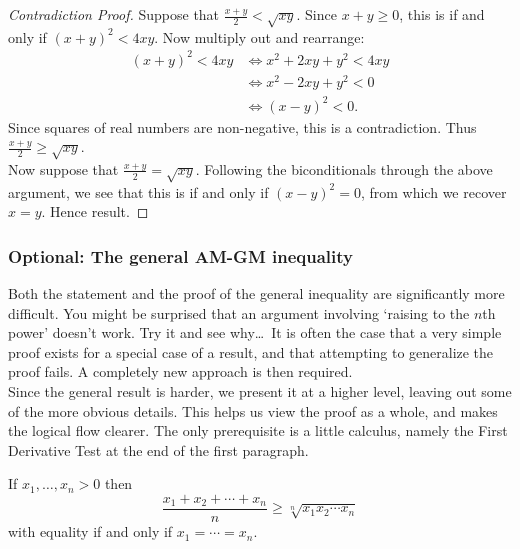 \begin{nopgbreak}
\begin{proof}[Contradiction Proof]
Suppose that $\frac{x+y}{2}<\sqrt{xy}$. Since $x+y\ge 0$, this is if and only if $(x+y)^2<4xy$. Now multiply out and rearrange:
\begin{align*}
(x+y)^2<4xy&\iff x^2+2xy+y^2<4xy\\
&\iff x^2-2xy+y^2<0\\
&\iff (x-y)^2<0.
\end{align*}
Since squares of real numbers are non-negative, this is a contradiction. Thus $\frac{x+y}{2}\ge \sqrt{xy}$.\\
Now suppose that $\frac{x+y}{2}=\sqrt{xy}$. Following the biconditionals through the above argument, we see that this is if and only if $(x-y)^2=0$, from which we recover $x=y$. Hence result.
\end{proof}
\end{nopgbreak}


\subsubsection*{Optional: The general AM-GM inequality}

Both the statement and the proof of the general inequality are significantly more difficult. You might be surprised that an argument involving `raising to the $n$th power' doesn't work. Try it and see why\ldots\ It is often the case that a very simple proof exists for a special case of a result, and that attempting to generalize the proof fails. A completely new approach is then required.\\
Since the general result is harder, we present it at a higher level, leaving out some of the more obvious details. This helps us view the proof as a whole, and makes the logical flow clearer. The only prerequisite is a little calculus, namely the First Derivative Test at the end of the first paragraph.

\begin{thm}
If $x_1,\ldots,x_n>0$ then
\[\frac{x_1+x_2+\cdots+x_n}n\ge\sqrt[n]{x_1x_2\cdots x_n}\]
with equality if and only if $x_1=\cdots =x_n$.
\end{thm}

